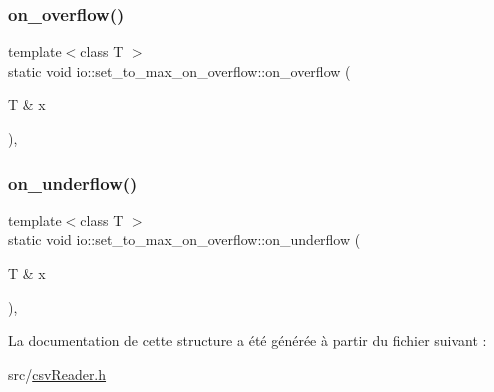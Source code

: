 \subsubsection{\texorpdfstring{on\+\_\+overflow()}{on\_overflow()}}
{\footnotesize\ttfamily template$<$class T $>$ \\
static void io\+::set\+\_\+to\+\_\+max\+\_\+on\+\_\+overflow\+::on\+\_\+overflow (\begin{DoxyParamCaption}\item[{T \&}]{x }\end{DoxyParamCaption})\hspace{0.3cm}{\ttfamily [inline]}, {\ttfamily [static]}}

\mbox{\label{structio_1_1set__to__max__on__overflow_a812d316e2b23247df19ca83bfda90a59}} 
\subsubsection{\texorpdfstring{on\+\_\+underflow()}{on\_underflow()}}
{\footnotesize\ttfamily template$<$class T $>$ \\
static void io\+::set\+\_\+to\+\_\+max\+\_\+on\+\_\+overflow\+::on\+\_\+underflow (\begin{DoxyParamCaption}\item[{T \&}]{x }\end{DoxyParamCaption})\hspace{0.3cm}{\ttfamily [inline]}, {\ttfamily [static]}}



La documentation de cette structure a été générée à partir du fichier suivant \+:\begin{DoxyCompactItemize}
\item 
src/\hyperlink{csvReader_8h}{csv\+Reader.\+h}\end{DoxyCompactItemize}
